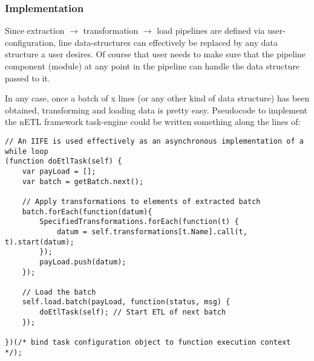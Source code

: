 \subsubsection{Implementation}
Since extraction \ensuremath{\rightarrow} transformation \ensuremath{\rightarrow} load pipelines are defined via user-configuration, line data-structures can effectively be replaced by any data structure a user desires. Of course that user needs to make sure that the pipeline component (module) at any point in the pipeline can handle the data structure passed to it.

In any case, once a batch of x lines (or any other kind of data structure) has been obtained, transforming and loading data is pretty easy. Pseudocode to implement the nETL framework task-engine could be written something along the lines of:

\begin{verbatim}
// An IIFE is used effectively as an asynchronous implementation of a while loop
(function doEtlTask(self) {
    var payLoad = [];
    var batch = getBatch.next();

    // Apply transformations to elements of extracted batch
    batch.forEach(function(datum){
        SpecifiedTransformations.forEach(function(t) {
            datum = self.transformations[t.Name].call(t, t).start(datum);
        });
        payLoad.push(datum);
    });

    // Load the batch
    self.load.batch(payLoad, function(status, msg) {
        doEtlTask(self); // Start ETL of next batch
    });

})(/* bind task configuration object to function execution context */);
\end{verbatim}